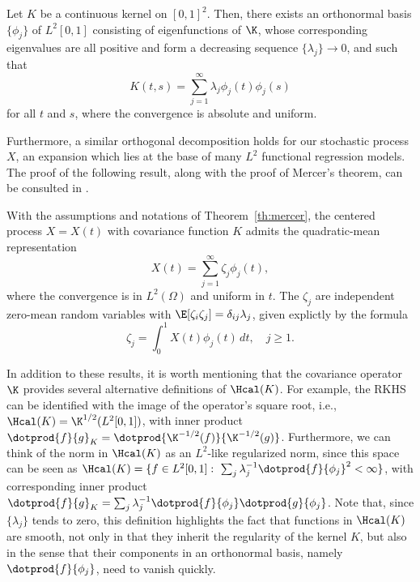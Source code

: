 \begin{theorem}\label{th:mercer}
    Let \(K\) be a continuous kernel on \([0,1]^2\). Then, there exists an orthonormal basis \(\{\phi_j\}\) of \(L^2[0,1]\) consisting of eigenfunctions of \(\K\), whose corresponding eigenvalues are all positive and form a decreasing sequence \(\{\lambda_j\}\to 0\), and such that
    \[
      K(t, s) = \sum_{j=1}^\infty \lambda_j \phi_j(t)\phi_j(s)
    \]
    for all \(t\) and \(s\), where the convergence is absolute and uniform.
\end{theorem}

Furthermore, a similar orthogonal decomposition holds for our stochastic process \(X\), an expansion which lies at the base of many \(L^2\) functional regression models. The proof of the following result, along with the proof of Mercer's theorem, can be consulted in \citet[][Ch.~3.2]{berlinet2004reproducing}.

\begin{theorem}
  With the assumptions and notations of Theorem~\eqref{th:mercer}, the centered process \(X=X(t)\) with covariance function \(K\) admits the quadratic-mean representation
  \[
  X(t) = \sum_{j=1}^\infty \zeta_j \phi_j(t),
  \]
  where the convergence is in \(L^2(\Omega)\) and uniform in \(t\). The \(\zeta_j\) are independent zero-mean random variables with \(\E[\zeta_i\zeta_j]=\delta_{ij}\lambda_j\), given explictly by the formula
  \[
    \zeta_j = \int_0^1 X(t)\phi_j(t)\, dt, \quad j\geq 1.
  \]
\end{theorem}

In addition to these results, it is worth mentioning that the covariance operator \(\K\) provides several alternative definitions of \(\Hcal(K)\). For example, the RKHS can be identified with the image of the operator's square root, i.e., \(\Hcal(K) = \K^{1/2}(L^2[0, 1])\), with inner product \(\dotprod{f}{g}_K = \dotprod{\K^{-1/2}(f)}{\K^{-1/2}(g)}\). Furthermore, we can think of the norm in \(\Hcal(K)\) as an \(L^2\)-like regularized norm, since this space can be seen as \(\Hcal(K) = \{f \in L^2[0, 1]: \ \sum_j \lambda_j^{-1}\dotprod{f}{\phi_j}^2 < \infty \}\), with corresponding inner product \(\dotprod{f}{g}_K = \sum_j \lambda_j^{-1}\dotprod{f}{\phi_j}\dotprod{g}{\phi_j}\). Note that, since \(\{\lambda_j\}\) tends to zero, this definition highlights the fact that functions in \(\Hcal(K)\) are smooth, not only in that they inherit the regularity of the kernel \(K\), but also in the sense that their components in an orthonormal basis, namely \(\dotprod{f}{\phi_j}\), need to vanish quickly.

